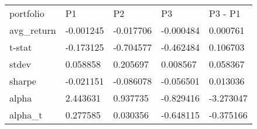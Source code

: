 \begin{tabular}{lllll}
\toprule
\midrule
portfolio & P1 & P2 & P3 & P3 - P1 \\
avg_return & -0.001245 & -0.017706 & -0.000484 & 0.000761 \\
t-stat & -0.173125 & -0.704577 & -0.462484 & 0.106703 \\
stdev & 0.058858 & 0.205697 & 0.008567 & 0.058367 \\
sharpe & -0.021151 & -0.086078 & -0.056501 & 0.013036 \\
alpha & 2.443631 & 0.937735 & -0.829416 & -3.273047 \\
alpha_t & 0.277585 & 0.030356 & -0.648115 & -0.375166 \\
\bottomrule
\end{tabular}
